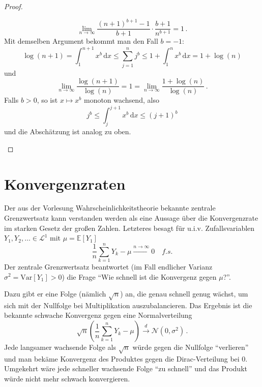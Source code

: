 \documentclass[ngerman,a4paper,11pt]{scrartcl}
\newcommand{\EE}{\mathbb{E}}
\renewcommand{\ll}{\mathcal{L}}
\newcommand{\nn}{\mathcal{N}}
\newcommand{\expect}[1]{\EE[#1]}
\newcommand{\dvar}[1]{\,\mathrm{d}#1}
\newcommand{\Var}[1]{\mathrm{Var}[#1]}
\begin{document}
\begin{proof}
\begin{thmlist}
\begin{equation*}
 \lim_{n\to\infty} \frac{(n+1)^{b+1}-1}{b+1}\cdot\frac{b+1}{n^{b+1}}=1\,.
\end{equation*}
Mit demselben Argument bekommt man den Fall $b=-1$:
\begin{equation*}
   \log(n+1)=\int_1^{n+1}x^b\dvar{x}\leq\sum_{j=1}^nj^b\leq 1+\int_1^nx^b\dvar{x}=1+\log(n)
\end{equation*}
und
\begin{equation*}
 \lim_{n\to\infty}\frac{\log(n+1)}{\log(n)} = 1 = \lim_{n\to\infty}\frac{1+\log(n)}{\log(n)}\,.
\end{equation*}
  Falls $b>0$, so ist $x\mapsto x^b$ monoton wachsend, also
  \begin{equation*}
   j^b\leq\int_j^{j+1}x^b\dvar{x}\leq (j+1)^b
  \end{equation*}
  und die Abschätzung ist analog zu oben.
  \end{thmlist}
\end{proof}
\section{Konvergenzraten}
Der aus der Vorlesung Wahrscheinlichkeitstheorie bekannte zentrale Grenzwertsatz
kann verstanden werden als eine Aussage über die Konvergenzrate im starken
Gesetz der großen Zahlen. Letzteres besagt für u.i.v. Zufallsvariablen
$Y_1,Y_2,\dotsc\in\ll^1$ mit $\mu =\expect{Y_1}$
\begin{equation*}
  \frac{1}{n}\sum_{k=1}^nY_k-\mu\overset{n\to\infty}{\longrightarrow} 0\quad\textit{f.s.} 
\end{equation*}
Der zentrale Grenzwertsatz beantwortet (im Fall endlicher Varianz
$\sigma^2=\Var{Y_1}>0$) die Frage
  \enquote{Wie schnell ist die Konvergenz gegen $\mu$?}.

Dazu gibt er eine Folge (nämlich $\sqrt{n}$) an, die genau schnell genug wächst,
um sich mit der Nullfolge bei Multiplikation auszubalancieren. Das Ergebnis ist die
bekannte schwache Konvergenz gegen eine Normalverteilung  
\begin{equation*}
 \sqrt{n}\left(\frac{1}{n}\sum_{k=1}^nY_k-\mu\right)\overset{d}{\to}\nn(0,\sigma^2)\,. 
\end{equation*}
Jede langsamer wachsende Folge als $\sqrt{n}$ würde gegen die Nullfolge
\enquote{verlieren} und man bekäme Konvergenz des Produktes gegen die
Dirac-Verteilung bei 0. Umgekehrt wäre jede schneller wachsende Folge
\enquote{zu schnell} und das Produkt würde nicht mehr schwach konvergieren. 
\end{document}
